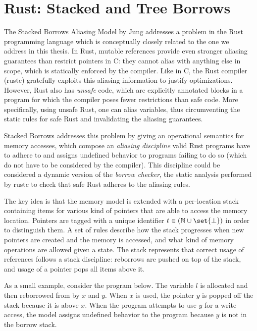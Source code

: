\section{Rust: Stacked and Tree Borrows}\label{section:rust}
The Stacked Borrows Aliasing Model by Jung \etall \cite{jung2019stacked} addresses
a problem in the Rust programming language which is conceptually closely related to the one we address in this thesis.
In Rust, mutable references  provide even stronger aliasing guarantees
than restrict pointers in C: they cannot alias with anything else in scope, which is statically enforced by the compiler.
Like in C, the Rust compiler (rustc) gratefully exploits this aliasing information to justify optimizations.
However, Rust also has \textit{unsafe} code, which are explicitly annotated
blocks in a program for which the compiler poses fewer restrictions than safe code.
More specifically, using unsafe Rust, one can alias  variables, thus circumventing the static rules for safe
Rust and invalidating the aliasing guarantees.

Stacked Borrows addresses this problem by giving an operational semantics for memory accesses, which compose an
\textit{aliasing discipline} valid Rust programs have to adhere to and assigns undefined behavior to programs failing
to do so (which do not have to be considered by the compiler).
This discipline could be considered a dynamic version of the
\textit{borrow checker}, the static analysis performed by rustc to check that safe Rust adheres to the aliasing rules.

The key idea is that the memory model is extended with a per-location stack containing items for various kind of
pointers that are able to access the memory location. Pointers are tagged with a unique identifier $t \in (\mathbb{N} \cup \set{\bot})$
in order to distinguish them. A set of rules describe how the stack progresses when new pointers are created and the memory
is accessed, and what kind of memory operations are allowed given a state. The stack represents that correct usage of
references follows a stack discipline: reborrows are pushed on top of the stack, and usage of a pointer pops all items 
above it.

As a small example, consider the program below. The variable $l$ is allocated and then reborrowed from by $x$ and $y$.
When $x$ is used, the pointer $y$ is popped off the stack because it is above $x$. When the program attempts to use
$y$ for a write access, the model assigns undefined behavior to the program because $y$ is not in the borrow stack.


